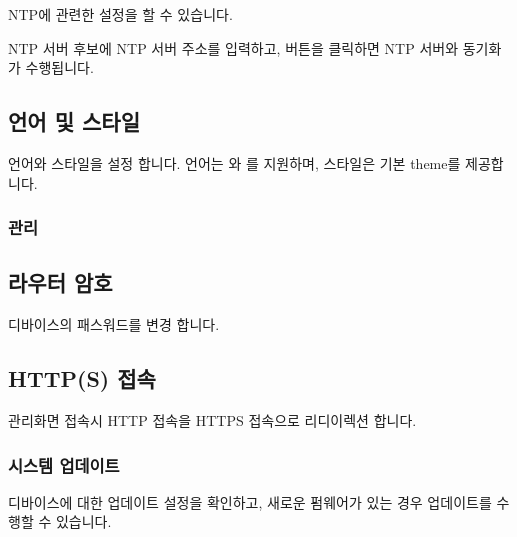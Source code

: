 \documentclass[letterpaper,10pt,english]{sphinxmanual}
\begin{document}
\sphinxAtStartPar
NTP에 관련한 설정을 할 수 있습니다.

\sphinxAtStartPar
NTP 서버 후보에 NTP 서버 주소를 입력하고,  버튼을 클릭하면 NTP 서버와 동기화가 수행됩니다.


\subsection{언어 및 스타일}
\label{\detokenize{main_menu/system:id4}}
\noindent{}

\sphinxAtStartPar
언어와 스타일을 설정 합니다. 언어는  와  를 지원하며, 스타일은  기본 theme를 제공합니다.


\subsubsection{관리}
\label{\detokenize{main_menu/system:id5}}

\subsection{라우터 암호}
\label{\detokenize{main_menu/system:id6}}
\noindent{}

\sphinxAtStartPar
디바이스의 패스워드를 변경 합니다.


\subsection{HTTP(S) 접속}
\label{\detokenize{main_menu/system:http-s}}
\noindent{}

\sphinxAtStartPar
관리화면 접속시 HTTP 접속을 HTTPS 접속으로 리디이렉션 합니다.


\subsubsection{시스템 업데이트}
\label{\detokenize{main_menu/system:id7}}
\sphinxAtStartPar
디바이스에 대한 업데이트 설정을 확인하고, 새로운 펌웨어가 있는 경우 업데이트를 수행할 수 있습니다.
\end{document}
